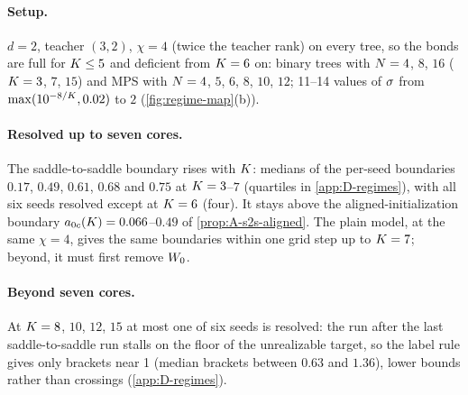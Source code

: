 \paragraph{Setup.}
$d=2$, teacher $(3,2)$, $\chi=4$ (twice the teacher rank) on every tree, so the bonds are full for $K\le5$ and
deficient from $K=6$ on: binary trees with $N=4$, $8$, $16$ ($K=3$, $7$, $15$) and MPS with $N=4$, $5$, $6$,
$8$, $10$, $12$; 11--14 values of $\sigma$ from $\max(10^{-8/K},0.02)$ to $2$ (\cref{fig:regime-map}(b)).

\paragraph{Resolved up to seven cores.}
\empirical{}  The saddle-to-saddle boundary rises with $K$: medians of the per-seed
boundaries $0.17$, $0.49$, $0.61$, $0.68$ and $0.75$ at $K=3$--$7$ (quartiles in \cref{app:D-regimes}), with all
six seeds resolved except at $K=6$ (four). It stays above the aligned-initialization boundary
$a_{0c}(K)=0.066$--$0.49$ of \cref{prop:A-s2s-aligned}. The plain model, at the same $\chi=4$, gives the same
boundaries within one grid step up to $K=7$; beyond, it must first remove $W_{0}$.

\paragraph{Beyond seven cores.}
\empirical{} At $K=8$, $10$, $12$, $15$ at most one of six seeds is resolved: the run after the last
saddle-to-saddle run stalls on the floor of the unrealizable target, so the label rule gives only brackets near
1 (median brackets between $0.63$ and $1.36$), lower bounds rather than crossings (\cref{app:D-regimes}).

